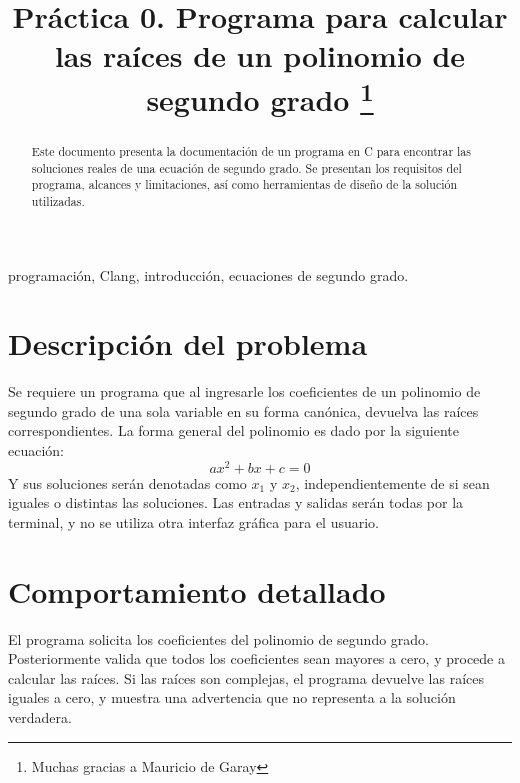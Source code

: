 \documentclass[conference]{IEEEtran}
\begin{document}
\title{Práctica 0. Programa para calcular las raíces de un polinomio de segundo grado
\thanks{Muchas gracias a Mauricio de Garay}
}

\author{
}

\maketitle

\begin{abstract}
Este documento presenta la documentación de un programa en C para encontrar las soluciones reales de una ecuación de segundo grado.
Se presentan los requisitos del programa, alcances y limitaciones, así como herramientas de diseño de la solución utilizadas.
\end{abstract}

\begin{IEEEkeywords}
programación, Clang, introducción, ecuaciones de segundo grado.
\end{IEEEkeywords}

\section{Descripción del problema}
Se requiere un programa que al ingresarle los coeficientes de un polinomio de segundo grado de una sola variable en su forma canónica, devuelva las raíces correspondientes. La forma general del polinomio es dado por la siguiente ecuación:
\begin{equation*}
    ax^2+bx+c = 0
\end{equation*}
Y sus soluciones serán denotadas como $x_1$ y $x_2$, independientemente de si sean iguales o distintas las soluciones.
Las entradas y salidas serán todas por la terminal, y no se utiliza otra interfaz gráfica para el usuario.

\section{Comportamiento detallado}
El programa solicita los coeficientes del polinomio de segundo grado. Posteriormente valida que todos los coeficientes sean mayores a cero, y procede a calcular las raíces. Si las raíces son complejas, el programa devuelve las raíces iguales a cero, y muestra una advertencia que no representa a la solución verdadera.
\end{document}

